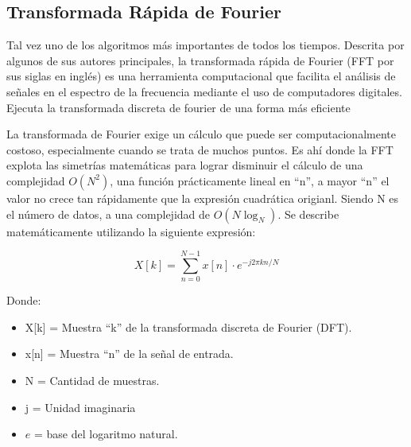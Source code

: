 


\subsection{Transformada Rápida de Fourier} Tal vez uno de los algoritmos más importantes de todos los tiempos. Descrita por algunos de sus autores principales, la transformada rápida de Fourier  (FFT por sus siglas en inglés) es una herramienta computacional que facilita el análisis de señales en el espectro de la frecuencia mediante el uso de computadores digitales. Ejecuta la transformada discreta de fourier de una forma más eficiente 

La transformada de Fourier exige un cálculo que puede ser computacionalmente costoso, especialmente cuando se trata de muchos puntos. Es ahí donde la FFT explota las simetrías matemáticas para lograr disminuir el cálculo de una complejidad $O(N^2)$, una función prácticamente lineal en ``n'', a mayor ``n'' el valor no crece tan rápidamente que la expresión cuadrática origianl. Siendo N es el número de datos, a una complejidad de $O(N\log_{N})$. Se describe matemáticamente utilizando la siguiente expresión:

\begin{equation}
    X[k] = \sum_{n=0}^{N-1} x[n] \cdot e^{-j 2 \pi k n / N}
\end{equation}

Donde:

\begin{itemize}
    \item X[k] = Muestra ``k'' de la transformada discreta de Fourier (DFT).
    \item x[n] = Muestra ``n'' de la señal de entrada.
    \item N = Cantidad de muestras.
    \item j = Unidad imaginaria
    \item $e$ = base del logaritmo natural.
\end{itemize}

